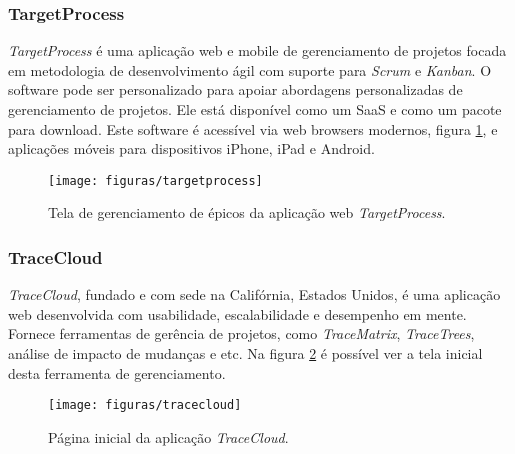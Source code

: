 \subsubsection*{TargetProcess}
\textit{TargetProcess} é uma aplicação web e mobile de gerenciamento de projetos focada em metodologia de desenvolvimento ágil com suporte para \textit{Scrum} e \textit{Kanban}. O software pode ser personalizado para apoiar abordagens personalizadas de gerenciamento de projetos. Ele está disponível como um SaaS e como um pacote para download. Este software é acessível via web browsers modernos, figura \ref{targetprocess}, e aplicações móveis para dispositivos iPhone, iPad e Android.
\begin{figure}[!htbp]
	\centering
	\texttt{[image: figuras/targetprocess]}
	\caption{Tela de gerenciamento de épicos da aplicação web \textit{TargetProcess}.}
	\label{targetprocess}
\end{figure}

\subsubsection*{TraceCloud}
\textit{TraceCloud}, fundado e com sede na Califórnia, Estados Unidos, é uma aplicação web desenvolvida com usabilidade, escalabilidade e desempenho em mente. Fornece ferramentas de gerência de projetos, como \textit{TraceMatrix}, \textit{TraceTrees}, análise de impacto de mudanças e etc. Na figura \ref{tracecloud} é possível ver a tela inicial desta ferramenta de gerenciamento.
\begin{figure}[!htbp]
	\centering
	\texttt{[image: figuras/tracecloud]}
	\caption{Página inicial da aplicação \textit{TraceCloud}.}
	\label{tracecloud}
\end{figure}

